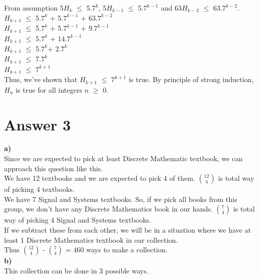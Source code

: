 ﻿\documentclass[12pt]{article}
\begin{document}
From assumption 5$H_{k}$ $\leq$ 5.$7^{k}$, 5$H_{k-1}$ $\leq$ 5.$7^{k-1}$ and 63$H_{k-2}$ $\leq$ 63.$7^{k-2}$.\\

$H_{k+1}$ $\leq$ 5.$7^{k}$ + 5.$7^{k-1}$ + 63.$7^{k-2}$\\

$H_{k+1}$ $\leq$ 5.$7^{k}$ + 5.$7^{k-1}$ + 9.$7^{k-1}$\\

$H_{k+1}$ $\leq$ 5.$7^{k}$ + 14.$7^{k-1}$\\

$H_{k+1}$ $\leq$ 5.$7^{k}$+ 2.$7^{k}$\\

$H_{k+1}$ $\leq$ 7.$7^{k}$\\

$H_{k+1}$ $\leq$ $7^{k+1}$\\

Thus, we've shown that $H_{k+1}$ $\leq$ $7^{k+1}$ is true. By principle of strong induction, $H_{n}$ is true for all integers $n$ $\geq$ 0.\\

\section*{Answer 3}
\textbf{a)}\\

Since we are expected to pick at least Discrete Mathematic textbook, we can approach this question like this.\\

We have 12 textbooks and we are expected to pick 4 of them. $\binom{12}{4}$ is total way of picking 4 textbooks.\\

We have 7 Signal and Systems textbooks. So, if we pick all books from this group, we don't have any Discrete Mathematics book in our hands. $\binom{7}{4}$ is total way of picking 4 Signal and Systems textbooks.\\

If we subtract these from each other, we will be in a situation where we have at least 1 Discrete Mathematics textbook in our collection.\\

Thus $\binom{12}{4}$ - $\binom{7}{4}$ = 460 ways to make a collection.\\
\textbf{b)}\\

This collection can be done in 3 possible ways.\\
\end{document}
